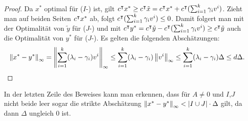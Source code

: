 \begin{proof}
	Da $x^*$ optimal für ($I$-\MIPR) ist, gilt $c^\intercal x^*\geq c^\intercal \tilde{x} = c^\intercal x^* + c^\intercal (\sum_{i=1}^k\gamma_iv^i)$.
	Zieht man auf beiden Seiten $c^\intercal x^*$ ab, folgt $c^\intercal(\sum_{i=1}^k\gamma_iv^i)\leq0$.
	Damit folgert man mit der Optimalität von $\tilde{y}$ für ($J$-\MIPR) und mit 
	$c^\intercal y^*=c^\intercal\tilde{y}-c^\intercal(\sum_{i=1}^k\gamma_iv^i)\geq c^\intercal\tilde{y}$
	auch die Optimalität von $y^*$ für ($J$-\MIPR).
	Es gelten die folgenden Abschätzungen:
	$$\left\lVert x^*-y^*\right\rVert_\infty=\left\lVert\sum_{i=1}^k(\lambda_i-\gamma_i)v^i\right\rVert_\infty\leq \sum_{i=1}^k(\lambda_i-\gamma_i)\left\lVert v^i\right\rVert_\infty\leq \sum_{i=1}^k(\lambda_i-\gamma_i)\Delta\leq d\Delta.
	$$
\end{proof}
\begin{remark}
	In der letzten Zeile des Beweises kann man erkennen, dass für $A\neq 0$ und $I$,$J$ nicht beide leer sogar die strikte Abschätzung $\left\lVert x^*-y^*\right\rVert_\infty<\lvert I\cup J \rvert\cdot\Delta$ gilt, da dann $\Delta$ ungleich $0$ ist.
\end{remark}

